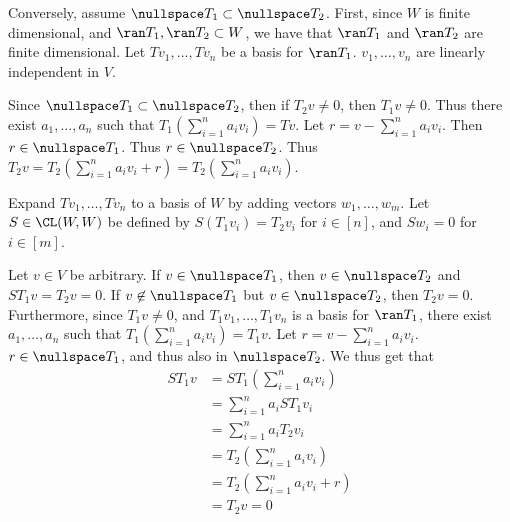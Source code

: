 \documentclass{book}
\begin{document}
\begin{enumerate}[label=\arabic*)]
      Conversely, assume $\nullspace T_1 \subset \nullspace T_2$. First, since $W$ is finite dimensional, and $\ran T_1, \ran T_2 \subset W$, we have that $\ran T_1$ and $\ran T_2$ are finite
      dimensional. Let $Tv_{1}, \dots, Tv_{n}$ be a basis for $\ran T_1$. $v_{1}, \dots, v_{n}$ are linearly independent in $V$.

      Since $\nullspace T_1 \subset \nullspace T_2$, then if  $T_2v \neq 0$, then $T_1v \neq 0$. Thus there exist $a_1, \dots, a_n$ such that $T_1(\sum_{i = 1}^{n}a_iv_i) = Tv$. Let $r = v -
      \sum_{i = 1}^{n}a_iv_i$. Then $r \in \nullspace T_1$. Thus $r \in \nullspace T_2$.  Thus $T_2v = T_2(\sum_{i = 1}^{n}a_iv_i + r) = T_2(\sum_{i = 1}^{n}a_iv_i)$. 

      Expand $Tv_1, \dots, Tv_n$ to a basis of $W$ by adding vectors $w_1, \dots, w_m$. Let $S \in \CL(W, W)$ be defined by $S(T_1v_i) = T_2v_i$ for $i \in [n]$, and $Sw_i = 0$ for $i \in
      [m]$. 

      Let $v \in V$ be arbitrary. If $v \in \nullspace T_1$, then $v \in \nullspace T_2$ and $ST_1v = T_2v = 0$. If $v \not\in \nullspace T_1$ but $v \in \nullspace T_2$, then $T_2v = 0$.
      Furthermore, since $T_1v \neq 0$, and $T_1v_1, \dots, T_1v_n$ is a basis for $\ran T_1$, there exist $a_1, \dots, a_n$ such that $T_1(\sum_{i = 1}^{n}a_iv_i) = T_1v$. Let $r = v -
      \sum_{i = 1}^{n}a_iv_i$. $r \in \nullspace T_1$, and thus also in $\nullspace T_2$. We thus get that
      \begin{align*}
        ST_1v & = ST_1(\sum_{i = 1}^{n}a_iv_i) \\
        & = \sum_{i = 1}^{n}a_iST_1v_i \\
        & = \sum_{i = 1}^{n}a_iT_2v_i \\
        & = T_2(\sum_{i = 1}^{n}a_iv_i) \\
        & = T_2(\sum_{i = 1}^{n}a_iv_i + r) \\
        & = T_2v = 0
      \end{align*}


\end{enumerate}
\end{document}

